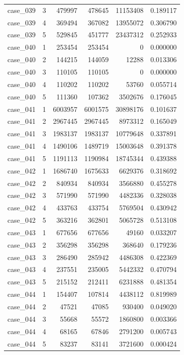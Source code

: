 \begin{longtable}{lrrrrr}
case\_039 & 3 & 479997 & 478645 & 11153408 & 0.189117 \\
case\_039 & 4 & 369494 & 367082 & 13955072 & 0.306790 \\
case\_039 & 5 & 529845 & 451777 & 23437312 & 0.252933 \\
case\_040 & 1 & 253454 & 253454 & 0 & 0.000000 \\
case\_040 & 2 & 144215 & 144059 & 12288 & 0.013306 \\
case\_040 & 3 & 110105 & 110105 & 0 & 0.000000 \\
case\_040 & 4 & 110202 & 110202 & 53760 & 0.055714 \\
case\_040 & 5 & 111360 & 107362 & 3502676 & 0.176045 \\
case\_041 & 1 & 6003957 & 6001575 & 30898176 & 0.101637 \\
case\_041 & 2 & 2967445 & 2967445 & 8973312 & 0.165049 \\
case\_041 & 3 & 1983137 & 1983137 & 10779648 & 0.337891 \\
case\_041 & 4 & 1490106 & 1489719 & 15003648 & 0.391378 \\
case\_041 & 5 & 1191113 & 1190984 & 18745344 & 0.439388 \\
case\_042 & 1 & 1686740 & 1675633 & 6629376 & 0.318692 \\
case\_042 & 2 & 840934 & 840934 & 3566880 & 0.455278 \\
case\_042 & 3 & 571990 & 571990 & 4482336 & 0.328038 \\
case\_042 & 4 & 433763 & 433754 & 5769504 & 0.430942 \\
case\_042 & 5 & 363216 & 362801 & 5065728 & 0.513108 \\
case\_043 & 1 & 677656 & 677656 & 49160 & 0.033207 \\
case\_043 & 2 & 356298 & 356298 & 368640 & 0.179236 \\
case\_043 & 3 & 286490 & 285942 & 4486308 & 0.422369 \\
case\_043 & 4 & 237551 & 235005 & 5442332 & 0.470794 \\
case\_043 & 5 & 215152 & 212411 & 6231888 & 0.481354 \\
case\_044 & 1 & 154407 & 107814 & 4438112 & 0.819989 \\
case\_044 & 2 & 47521 & 47085 & 930400 & 0.049020 \\
case\_044 & 3 & 55668 & 55572 & 1860800 & 0.003366 \\
case\_044 & 4 & 68165 & 67846 & 2791200 & 0.005743 \\
case\_044 & 5 & 83237 & 83141 & 3721600 & 0.000424 \\

\end{longtable}
